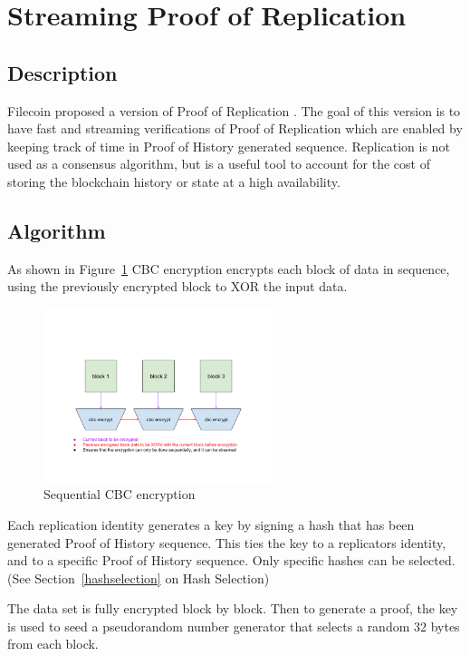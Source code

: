 \documentclass[12pt]{article}
\begin{document}
\section{Streaming Proof of Replication}\label{porep}
\subsection{Description}
Filecoin proposed a version of Proof of Replication \cite{filecoinporep}. The goal of this version is to have fast and streaming verifications of Proof of Replication which are enabled by keeping track of time in Proof of History generated sequence. Replication is not used as a consensus algorithm, but is a useful tool to account for the cost of storing the blockchain history or state at a high availability.
\subsection{Algorithm}
As shown in Figure~\ref{fig:encrypt} CBC encryption encrypts each block of data in sequence, using the previously encrypted block to XOR the input data.

\begin{figure}
  \begin{center}
    \centering
    \includegraphics[width=0.6\textwidth]{figures/fig_7.png}
    \caption[Fig 7]{Sequential CBC encryption\label{fig:encrypt}}
  \end{center}
  \end{figure}

Each replication identity generates a key by signing a hash that has been generated Proof of History sequence. This ties the key to a replicators identity, and to a specific Proof of History sequence. Only specific hashes can be selected. (See Section~\ref{hashselection} on Hash Selection)

The data set is fully encrypted block by block. Then to generate a proof, the key is used to seed a pseudorandom number generator that selects a random 32 bytes from each block.
\end{document}
